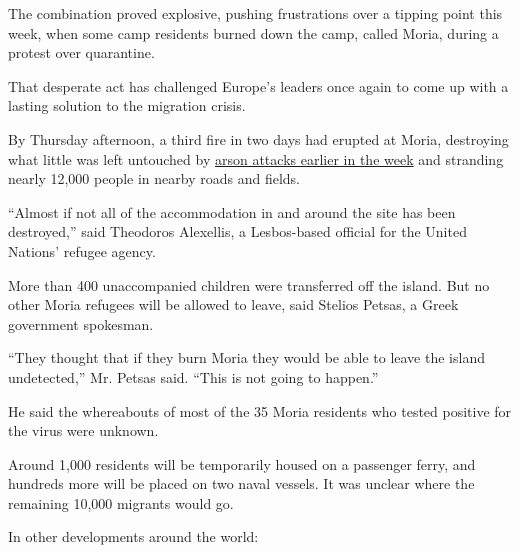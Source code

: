 The combination proved explosive, pushing frustrations over a tipping
point this week, when some camp residents burned down the camp, called
Moria, during a protest over quarantine.

That desperate act has challenged Europe's leaders once again to come up
with a lasting solution to the migration crisis.

By Thursday afternoon, a third fire in two days had erupted at Moria,
destroying what little was left untouched by
\href{https://www.nytimes3xbfgragh.onion/2020/09/09/world/europe/fire-refugee-camp-lesbos-moria.html}{arson
attacks earlier in the week} and stranding nearly 12,000 people in
nearby roads and fields.

``Almost if not all of the accommodation in and around the site has been
destroyed,'' said Theodoros Alexellis, a Lesbos-based official for the
United Nations' refugee agency.

More than 400 unaccompanied children were transferred off the island.
But no other Moria refugees will be allowed to leave, said Stelios
Petsas, a Greek government spokesman.

``They thought that if they burn Moria they would be able to leave the
island undetected,'' Mr. Petsas said. ``This is not going to happen.''

He said the whereabouts of most of the 35 Moria residents who tested
positive for the virus were unknown.

Around 1,000 residents will be temporarily housed on a passenger ferry,
and hundreds more will be placed on two naval vessels. It was unclear
where the remaining 10,000 migrants would go.

In other developments around the world:

